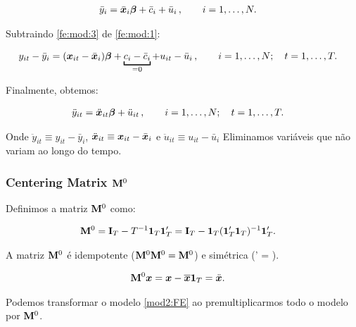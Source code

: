\documentclass[11pt, oneside, a4paper, article]{article}
\numberwithin{equation}{section}
\begin{document}
\vspace{-1 em}
\begin{align} \label{fe:mod:3}
	\bar{y}_{i} &= \bar{\boldsymbol{x}}_{i} \boldsymbol{\beta} + \bar{c}_{i} + \bar{u}_{i} 
	\, , \qquad	i = 1, \dots, N.
\end{align}

Subtraindo \eqref{fe:mod:3} de \eqref{fe:mod:1}:

\vspace{-1 em}
\begin{align} \label{fe:mod:4}
y_{it} - \bar{y}_{i} &=
(\xvec_{it} - \bar{\xvec}_{i}) \betavec +
\underbracket[1pt]{c_{i} - \bar{c}_{i}}_{=0} +
u_{it} - \bar{u}_{i} 
\, , \qquad	i = 1, \dots, N; \quad t = 1, \dots, T.
\end{align}

\noindent
Finalmente, obtemos:

\vspace{-1 em}
\begin{align} \label{fe:mod:5}
\ddot{y}_{it} &= \ddot{\boldsymbol{x}}_{it} \boldsymbol{\beta} + \ddot{u}_{it} 
\, , \qquad	i = 1, \dots, N; \quad t = 1, \dots, T.
\end{align}

\noindent
Onde 
$\ddot{y}_{it} \equiv y_{it} - \bar{y}_{i}$, 
$\ddot{\boldsymbol{x}}_{it} \equiv \boldsymbol{x}_{it} - \bar{\boldsymbol{x}}_{i}$ e
$\ddot{u}_{it} \equiv u_{it} - \bar{u}_{i}$
Eliminamos variáveis que não variam ao longo do tempo.

\subsubsection{Centering Matrix $\mathbf{M}^{0}$}

Definimos a matriz $\mathbf{M}^{0}$ como:

\vspace{-1 em}
\begin{align*}
	\mathbf{M}^{0} &=
	\mathbf{I}_{T} - T^{-1} \boldsymbol{1}_{T} \boldsymbol{1}_{T}'
	=
	\mathbf{I}_{T} - \boldsymbol{1}_{T} (\boldsymbol{1}_{T}' \boldsymbol{1}_{T})^{-1} \boldsymbol{1}_{T}'.
\end{align*}

\vspace{1 em}
A matriz $\mathbf{M}^{0}$ é idempotente ($\mathbf{M}^{0} \mathbf{M}^{0} = \mathbf{M}^{0}$) e simétrica (\Mzero' = \Mzero).

\begin{align*}
	\mathbf{M}^{0} \boldsymbol{x} &= \boldsymbol{x} - \overline{\boldsymbol{x}} \boldsymbol{1}_{T}
	= \ddot{\boldsymbol{x}}.
\end{align*}

Podemos transformar o modelo \eqref{mod2:FE} ao premultiplicarmos todo o modelo por $\mathbf{M}^{0}$.
\end{document}
